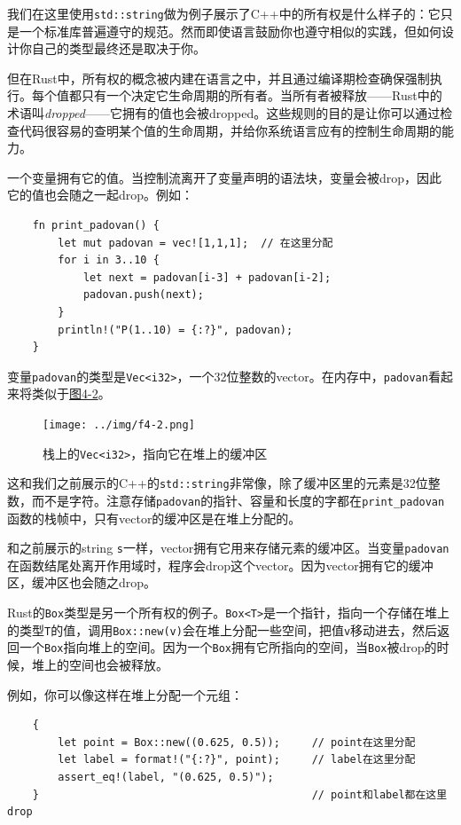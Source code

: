 我们在这里使用\texttt{std::string}做为例子展示了C++中的所有权是什么样子的：它只是一个标准库普遍遵守的规范。然而即使语言鼓励你也遵守相似的实践，但如何设计你自己的类型最终还是取决于你。

但在Rust中，所有权的概念被内建在语言之中，并且通过编译期检查确保强制执行。每个值都只有一个决定它生命周期的所有者。当所有者被释放——Rust中的术语叫\emph{dropped}——它拥有的值也会被dropped。这些规则的目的是让你可以通过检查代码很容易的查明某个值的生命周期，并给你系统语言应有的控制生命周期的能力。

一个变量拥有它的值。当控制流离开了变量声明的语法块，变量会被drop，因此它的值也会随之一起drop。例如：
\begin{verbatim}
    fn print_padovan() {
        let mut padovan = vec![1,1,1];  // 在这里分配
        for i in 3..10 {
            let next = padovan[i-3] + padovan[i-2];
            padovan.push(next);
        }
        println!("P(1..10) = {:?}", padovan);
    }
\end{verbatim}

变量\texttt{padovan}的类型是\texttt{Vec<i32>}，一个32位整数的vector。在内存中，\texttt{padovan}看起来将类似于\hyperref[f4-2]{图4-2}。

\begin{figure}[htbp]
    \centering
    \texttt{[image: ../img/f4-2.png]}
    \caption{栈上的\texttt{Vec<i32>}，指向它在堆上的缓冲区}
    \label{f4-2}
\end{figure}

这和我们之前展示的C++的\texttt{std::string}非常像，除了缓冲区里的元素是32位整数，而不是字符。注意存储\texttt{padovan}的指针、容量和长度的字都在\texttt{print\_padovan}函数的栈帧中，只有vector的缓冲区是在堆上分配的。

和之前展示的string \texttt{s}一样，vector拥有它用来存储元素的缓冲区。当变量\texttt{padovan}在函数结尾处离开作用域时，程序会drop这个vector。因为vector拥有它的缓冲区，缓冲区也会随之drop。

Rust的\texttt{Box}类型是另一个所有权的例子。\texttt{Box<T>}是一个指针，指向一个存储在堆上的类型\texttt{T}的值，调用\texttt{Box::new(v)}会在堆上分配一些空间，把值\texttt{v}移动进去，然后返回一个\texttt{Box}指向堆上的空间。因为一个\texttt{Box}拥有它所指向的空间，当\texttt{Box}被drop的时候，堆上的空间也会被释放。

例如，你可以像这样在堆上分配一个元组：
\begin{verbatim}
    {
        let point = Box::new((0.625, 0.5));     // point在这里分配
        let label = format!("{:?}", point);     // label在这里分配
        assert_eq!(label, "(0.625, 0.5)");
    }                                           // point和label都在这里drop
\end{verbatim}

